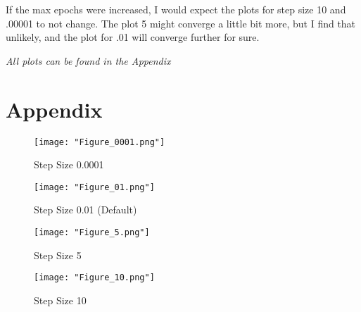 \documentclass{article}
\begin{document}
        If the max epochs were increased, I would expect the plots for step size 10 and .00001 to not change. 
        The plot 5 might converge a little bit more, but I find that unlikely, 
        and the plot for .01 will converge further for sure.

        \textit{All plots can be found in the Appendix}



    \clearpage
    \section*{Appendix}
        \begin{figure}[h]
            \texttt{[image: "Figure\_0001.png"]}
            \caption{Step Size 0.0001}
        \end{figure}
        \begin{figure}[h!]
            \texttt{[image: "Figure\_01.png"]}
            \caption{Step Size 0.01 (Default)}
        \end{figure}
        \begin{figure}[t]
            \texttt{[image: "Figure\_5.png"]}
            \caption{Step Size 5}
        \end{figure}
        \begin{figure}[b]
            \texttt{[image: "Figure\_10.png"]}
            \caption{Step Size 10}
        \end{figure}
        \clearpage

        



    
            
\end{document}
